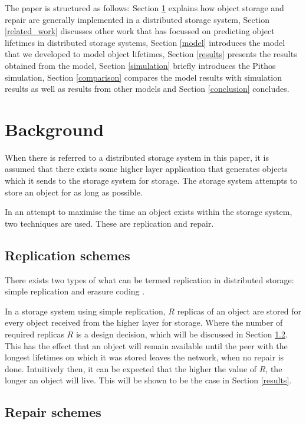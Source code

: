 \documentclass[10pt,a4paper,conference]{IEEEtran}
\begin{document}
The paper is structured as follows: Section \ref{background} explains how object storage and repair are generally implemented in a distributed storage system,
%
Section \ref{related_work} discusses other work that has focussed on predicting object lifetimes in distributed storage systems,
%
Section \ref{model} introduces the model that we developed to model object lifetimes,
%
Section \ref{results} presents the results obtained from the model,
%
Section \ref{simulation} briefly introduces the Pithos simulation,
%
Section \ref{comparison} compares the model results with simulation results as well as results from other models and
%
Section \ref{conclusion} concludes.

\section{Background}
\label{background}

When there is referred to a distributed storage system in this paper, it is assumed that there exists some higher layer application that generates objects which it sends to the storage system for storage. The storage system attempts to store an object for as long as possible.

In an attempt to maximise the time an object exists within the storage system, two techniques are used. These are replication and repair.

\subsection{Replication schemes}

There exists two types of what can be termed replication in distributed storage: simple replication and erasure coding \cite{}.

In a storage system using simple replication, $R$ replicas of an object are stored for every object received from the higher layer for storage. Where the number of required replicas $R$ is a design decision, which will be discussed in Section \ref{}. This has the effect that an object will remain available until the peer with the longest lifetimes on which it was stored leaves the network, when no repair is done. Intuitively then, it can be expected that the higher the value of $R$, the longer an object will live. This will be shown to be the case in Section \ref{results}.

\subsection{Repair schemes}
\end{document}
